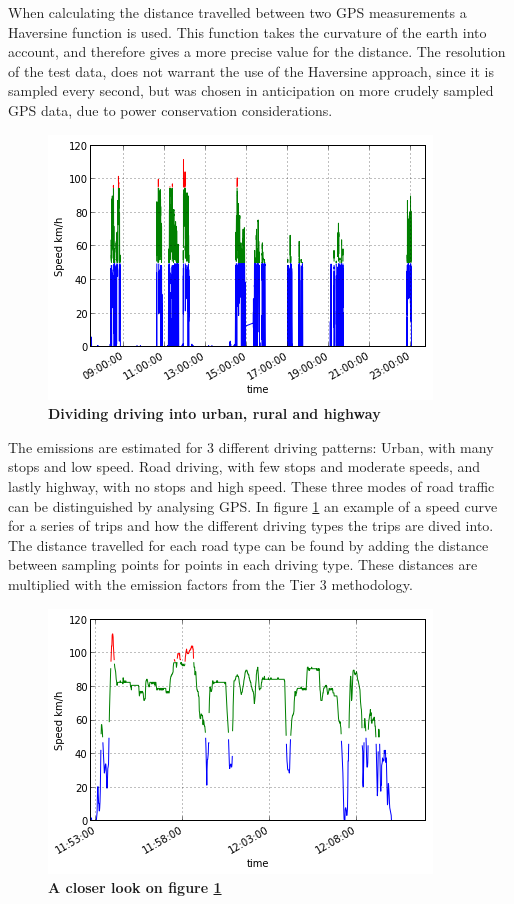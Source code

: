 When calculating the distance travelled between two GPS measurements a Haversine function is used. This function takes the curvature of the earth into account, and therefore gives a more precise value for the distance. The resolution of the test data, does not warrant the use of the Haversine approach, since it is sampled every second, but was chosen in anticipation on more crudely sampled GPS data, due to power conservation considerations.
\begin{figure}[!ht]
\begin{center}
\includegraphics{speed_division.png}
\caption{{\bf Dividing driving into urban, rural and highway}}
\label{speed_division}
\end{center}
\end{figure}

The emissions are estimated for 3 different driving patterns: Urban, with many stops and low speed. Road driving, with few stops and moderate speeds, and lastly highway, with no stops and high speed. These three modes of road traffic can be distinguished by analysing GPS.  In figure \ref{speed_division} an example of a speed curve for a series of trips and how the different driving types the trips are dived into. The distance travelled for each road type can be found by adding the distance between sampling points for points in each driving type. These distances are multiplied with the emission factors from the Tier 3 methodology.

\begin{figure}[!ht]
\begin{center}
\includegraphics{speed_division_zoom.png}
\caption{{\bf A closer look on figure \ref{speed_division}}}
\label{speed_division_zoom}
\end{center}
\end{figure}

